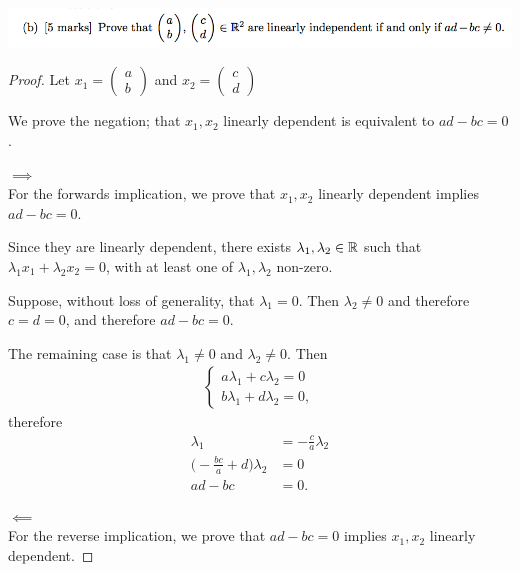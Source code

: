 \documentclass[12pt]{article}
\begin{document}
~\\
\newpage
\begin{mdframed}
\includegraphics[width=400pt]{img/oxford-prelims-2017-A-1-2.png}
\end{mdframed}

\renewcommand{\cvec}[2]{\begin{pmatrix}#1\\#2\end{pmatrix}}

\begin{proof}
Let $x_1 = \cvec{a}{b}$ and $x_2 = \cvec{c}{d}$

We prove the negation; that $x_1, x_2$ linearly dependent is equivalent to
$ad - bc = 0$.

$\implies$\\
For the forwards implication, we prove that $x_1, x_2$ linearly dependent
implies $ad - bc = 0$.

Since they are linearly dependent, there exists $\lambda_1, \lambda_2 \in \mathbb{R}$
such that $\lambda_1x_1 + \lambda_2x_2 = 0$, with at least one of
$\lambda_1, \lambda_2$ non-zero.

Suppose, without loss of generality, that $\lambda_1 = 0$. Then
$\lambda_2 \neq 0$ and therefore $c = d = 0$, and therefore $ad - bc = 0$.

The remaining case is that $\lambda_1 \neq 0$ and $\lambda_2 \neq 0$. Then
\begin{align*}
  \begin{cases}
    a\lambda_1 + c\lambda_2 = 0\\
    b\lambda_1 + d\lambda_2 = 0,
  \end{cases}
\end{align*}
therefore
\begin{align*}
  \lambda_1                            &= -\frac{c}{a}\lambda_2\\
  \Big(-\frac{bc}{a} + d\Big)\lambda_2 &= 0\\
  ad - bc                              &= 0.
\end{align*}

$\impliedby$\\
For the reverse implication, we prove that $ad - bc = 0$ implies $x_1, x_2$
linearly dependent.



\end{proof}
\end{document}
